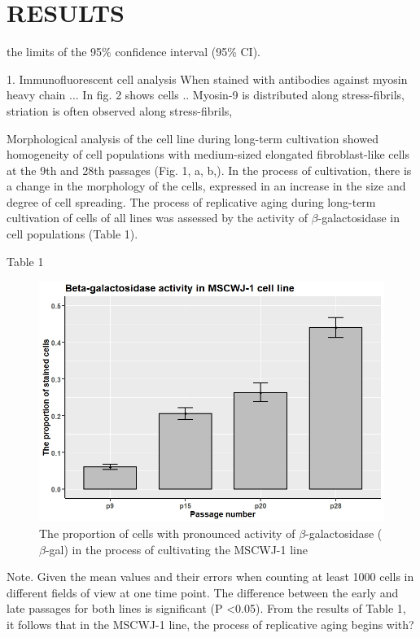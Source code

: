 \documentclass[a4paper,12pt]{article}
\begin{document}
\section{RESULTS}

the limits of the 95\% confidence interval (95\% CI).

1. Immunofluorescent cell analysis
When stained with antibodies against myosin heavy chain ...
In fig. 2 shows cells ..
Myosin-9 is distributed along stress-fibrils, striation is often observed along stress-fibrils,

Morphological analysis of the cell line during long-term cultivation showed homogeneity of cell populations with medium-sized elongated fibroblast-like cells at the 9th and 28th passages (Fig. 1, a, b,). In the process of cultivation, there is a change in the morphology of the cells, expressed in an increase in the size and degree of cell spreading.
The process of replicative aging during long-term cultivation of cells of all lines was assessed by the activity of $\beta$-galactosidase in cell populations (Table 1).


Table 1

\begin{figure}[hbt!]
\centering
\includegraphics[width=0.7\linewidth]{fig0.jpeg}
\caption{The proportion of cells with pronounced activity of $\beta$-galactosidase ($\beta$-gal)
 in the process of cultivating the MSCWJ-1 line}
\label{fig:tab}
\end{figure}

Note. Given the mean values and their errors when counting at least 1000 cells in different fields of view at one time point. The difference between the early and late passages for both lines is significant (P <0.05).
  From the results of Table 1, it follows that in the MSCWJ-1 line, the process of replicative aging begins with?
\end{document}

